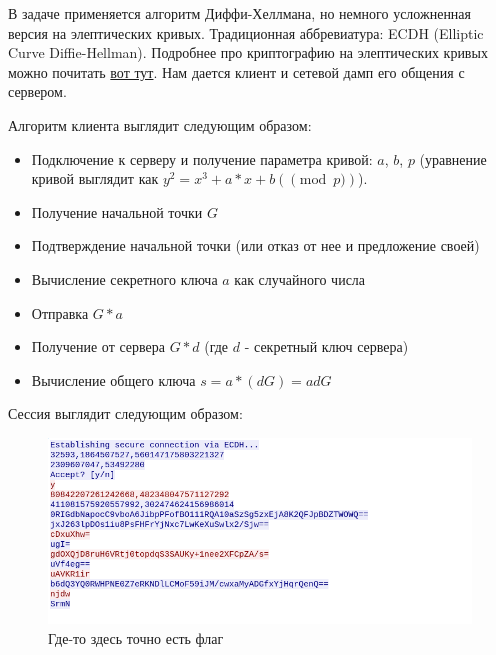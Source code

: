 \documentclass[idxtotoc,hyperref,openany,oneside]{files/crypto} %
\begin{document}
В задаче применяется алгоритм Диффи-Хеллмана, но немного усложненная версия на элептических кривых. Традиционная аббревиатура: ECDH (Elliptic Curve Diffie-Hellman). Подробнее про криптографию на элептических кривых можно почитать \href{https://habr.com/ru/post/335906/}{вот тут}. Нам дается клиент и сетевой дамп его общения с сервером.

Алгоритм клиента выглядит следующим образом:
\begin{itemize}
	\item Подключение к серверу и получение параметра кривой: $a$, $b$, $p$ (уравнение кривой выглядит как $y^2 = x^3 + a*x + b (\pmod{p})$).
	\item Получение начальной точки $G$
	\item Подтверждение начальной точки (или отказ от нее и предложение своей)
	\item Вычисление секретного ключа $a$ как случайного числа
	\item Отправка $G * a$
	\item Получение от сервера $G * d$ (где $d$ - секретный ключ сервера)
	\item Вычисление общего ключа $s = a * (dG) = adG$
\end{itemize}

Сессия выглядит следующим образом:
\begin{figure}[H]
\begin{center}
\includegraphics[width=1.0\linewidth]{files/wireshark}
\end{center}
\caption{Где-то здесь точно есть флаг}
\label{fig:chinese}
\end{figure}
\end{document}
